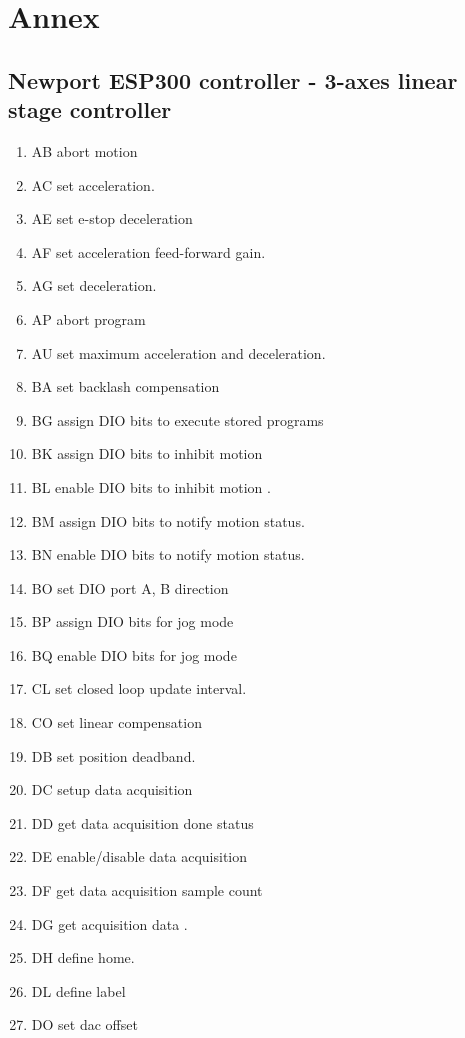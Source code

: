 \documentclass[10pt,letter,twoside]{report}
\begin{document}
\chapter{Annex}
\small \label{sec:annex}
\section{Newport ESP300 controller - 3-axes linear stage controller}
\begin{enumerate}
\item AB abort motion 
\item AC set acceleration. 
\item AE set e-stop deceleration 
\item AF set acceleration feed-forward gain. 
\item AG set deceleration. 
\item AP abort program 
\item AU set maximum acceleration and deceleration. 
\item BA set backlash compensation 
\item BG assign DIO bits to execute stored programs 
\item BK assign DIO bits to inhibit motion 
\item BL enable DIO bits to inhibit motion . 
\item BM assign DIO bits to notify motion status. 
\item BN enable DIO bits to notify motion status. 
\item BO set DIO port A, B direction 
\item BP assign DIO bits for jog mode 
\item BQ enable DIO bits for jog mode 
\item CL set closed loop update interval. 
\item CO set linear compensation 
\item DB set position deadband. 
\item DC setup data acquisition 
\item DD get data acquisition done status 
\item DE enable/disable data acquisition  
\item DF get data acquisition sample count 
\item DG get acquisition data . 
\item DH define home. 
\item DL define label 
\item DO set dac offset  

\end{enumerate}
\end{document}
